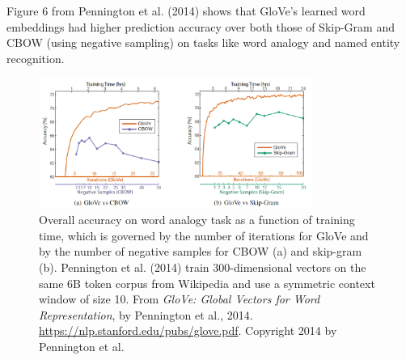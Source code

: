 Figure 6 from Pennington et al. (2014) shows that GloVe's learned word embeddings had higher prediction accuracy over both those of Skip-Gram and CBOW (using negative sampling) on tasks like word analogy and named entity recognition. 

\begin{figure}[h]
\vspace{-5pt}
\centering
\includegraphics[width=0.8\textwidth]{imgs/table_gloveVSword2vec.png}
\vspace{-5pt}
\caption{\footnotesize Overall accuracy on word analogy task as a function of training time, which is governed by the number of iterations for GloVe and by the number of negative samples for CBOW (a) and skip-gram (b). Pennington et al. (2014) train 300-dimensional vectors on the same 6B token corpus from Wikipedia and use a symmetric context window of size 10. From \emph{GloVe: Global Vectors for Word Representation}, by Pennington et al., 2014. \url{https://nlp.stanford.edu/pubs/glove.pdf}. Copyright 2014 by Pennington et al.}
\vspace{-5pt}
\end{figure}